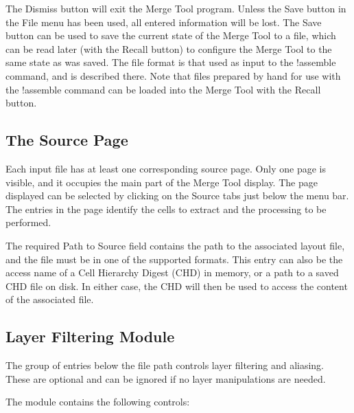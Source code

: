 The {\cb Dismiss} button will exit the {\cb Merge Tool} program. 
Unless the {\cb Save} button in the {\cb File} menu has been used, all
entered information will be lost.  The {\cb Save} button can be used
to save the current state of the {\cb Merge Tool} to a file, which can
be read later (with the {\cb Recall} button) to configure the {\cb
Merge Tool} to the same state as was saved.  The file format is that
used as input to the {\cb !assemble} command, and is described there. 
Note that files prepared by hand for use with the {\cb !assemble}
command can be loaded into the {\cb Merge Tool} with the {\cb Recall}
button.

\subsection{The Source Page}

Each input file has at least one corresponding source page.  Only one
page is visible, and it occupies the main part of the {\cb Merge Tool}
display.  The page displayed can be selected by clicking on the {\cb
Source} tabs just below the menu bar.  The entries in the page
identify the cells to extract and the processing to be performed.

The required {\cb Path to Source} field contains the path to the
associated layout file, and the file must be in one of the supported
formats.  This entry can also be the access name of a Cell Hierarchy
Digest (CHD) in memory, or a path to a saved CHD file on disk.  In
either case, the CHD will then be used to access the content of the
associated file.

\subsection{Layer Filtering Module}

The group of entries below the file path controls layer filtering and
aliasing.  These are optional and can be ignored if no layer
manipulations are needed.

The module contains the following controls:

